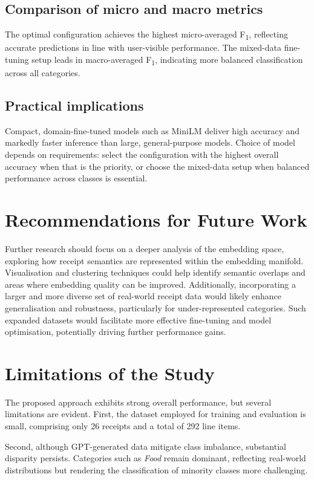 \documentclass{SGGW-thesis-EN}
\begin{document}
\subsection{Comparison of micro and macro metrics}
The optimal configuration achieves the highest micro-averaged F\textsubscript{1}, reflecting accurate predictions in line
with user-visible performance. The mixed-data fine-tuning setup leads in macro-averaged F\textsubscript{1}, indicating
more balanced classification across all categories.

\subsection{Practical implications}
Compact, domain-fine-tuned models such as MiniLM deliver high accuracy and markedly faster inference than large,
general-purpose models. Choice of model depends on requirements: select the configuration with the highest overall
accuracy when that is the priority, or choose the mixed-data setup when balanced performance across classes is essential.


\section{Recommendations for Future Work}
Further research should focus on a deeper analysis of the embedding space, exploring how receipt semantics are
represented within the embedding manifold. Visualisation and clustering techniques could help identify semantic
overlaps and areas where embedding quality can be improved. Additionally, incorporating a larger and more diverse set
of real-world receipt data would likely enhance generalisation and robustness, particularly for under-represented
categories. Such expanded datasets would facilitate more effective fine-tuning and model optimisation, potentially
driving further performance gains.


\section{Limitations of the Study}
The proposed approach exhibits strong overall performance, but several limitations are evident. First, the dataset
employed for training and evaluation is small, comprising only 26 receipts and a total of 292 line items.

Second, although GPT-generated data mitigate class imbalance, substantial disparity persists. Categories such as
\emph{Food} remain dominant, reflecting real-world distributions but rendering the classification of minority classes
more challenging.
\end{document}
